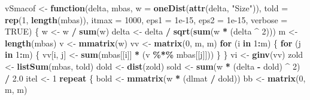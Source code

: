 \documentclass[
  12pt,
]{article}
\newenvironment{Shaded}{\begin{snugshade}}{\end{snugshade}}
\newcommand{\AttributeTok}[1]{\textcolor[rgb]{0.13,0.29,0.53}{#1}}
\newcommand{\ConstantTok}[1]{\textcolor[rgb]{0.56,0.35,0.01}{#1}}
\newcommand{\ControlFlowTok}[1]{\textcolor[rgb]{0.13,0.29,0.53}{\textbf{#1}}}
\newcommand{\DecValTok}[1]{\textcolor[rgb]{0.00,0.00,0.81}{#1}}
\newcommand{\FloatTok}[1]{\textcolor[rgb]{0.00,0.00,0.81}{#1}}
\newcommand{\FunctionTok}[1]{\textcolor[rgb]{0.13,0.29,0.53}{\textbf{#1}}}
\newcommand{\NormalTok}[1]{#1}
\newcommand{\OtherTok}[1]{\textcolor[rgb]{0.56,0.35,0.01}{#1}}
\newcommand{\SpecialCharTok}[1]{\textcolor[rgb]{0.81,0.36,0.00}{\textbf{#1}}}
\newcommand{\StringTok}[1]{\textcolor[rgb]{0.31,0.60,0.02}{#1}}
\begin{document}
\begin{Shaded}
\begin{Highlighting}[]
\NormalTok{vSmacof }\OtherTok{\textless{}{-}}
  \ControlFlowTok{function}\NormalTok{(delta,}
\NormalTok{           mbas,}
           \AttributeTok{w =} \FunctionTok{oneDist}\NormalTok{(}\FunctionTok{attr}\NormalTok{(delta, }\StringTok{"Size"}\NormalTok{)),}
           \AttributeTok{told =} \FunctionTok{rep}\NormalTok{(}\DecValTok{1}\NormalTok{, }\FunctionTok{length}\NormalTok{(mbas)),}
           \AttributeTok{itmax =} \DecValTok{1000}\NormalTok{,}
           \AttributeTok{eps1 =} \FloatTok{1e{-}15}\NormalTok{,}
           \AttributeTok{eps2 =} \FloatTok{1e{-}15}\NormalTok{,}
           \AttributeTok{verbose =} \ConstantTok{TRUE}\NormalTok{) \{}
\NormalTok{    w }\OtherTok{\textless{}{-}}\NormalTok{ w }\SpecialCharTok{/} \FunctionTok{sum}\NormalTok{(w)}
\NormalTok{    delta }\OtherTok{\textless{}{-}}\NormalTok{ delta }\SpecialCharTok{/} \FunctionTok{sqrt}\NormalTok{(}\FunctionTok{sum}\NormalTok{(w }\SpecialCharTok{*}\NormalTok{ (delta }\SpecialCharTok{\^{}} \DecValTok{2}\NormalTok{)))}
\NormalTok{    m }\OtherTok{\textless{}{-}} \FunctionTok{length}\NormalTok{(mbas)}
\NormalTok{    v }\OtherTok{\textless{}{-}} \FunctionTok{mmatrix}\NormalTok{(w)}
\NormalTok{    vv }\OtherTok{\textless{}{-}} \FunctionTok{matrix}\NormalTok{(}\DecValTok{0}\NormalTok{, m, m)}
    \ControlFlowTok{for}\NormalTok{ (i }\ControlFlowTok{in} \DecValTok{1}\SpecialCharTok{:}\NormalTok{m) \{}
      \ControlFlowTok{for}\NormalTok{ (j }\ControlFlowTok{in} \DecValTok{1}\SpecialCharTok{:}\NormalTok{m) \{}
\NormalTok{        vv[i, j] }\OtherTok{\textless{}{-}} \FunctionTok{sum}\NormalTok{(mbas[[i]] }\SpecialCharTok{*}\NormalTok{ (v }\SpecialCharTok{\%*\%}\NormalTok{ mbas[[j]]))}
\NormalTok{      \}}
\NormalTok{    \}}
\NormalTok{    vi }\OtherTok{\textless{}{-}} \FunctionTok{ginv}\NormalTok{(vv)}
\NormalTok{    zold }\OtherTok{\textless{}{-}} \FunctionTok{listSum}\NormalTok{(mbas, told)}
\NormalTok{    dold }\OtherTok{\textless{}{-}} \FunctionTok{dist}\NormalTok{(zold)}
\NormalTok{    sold }\OtherTok{\textless{}{-}} \FunctionTok{sum}\NormalTok{(w }\SpecialCharTok{*}\NormalTok{ (delta }\SpecialCharTok{{-}}\NormalTok{ dold) }\SpecialCharTok{\^{}} \DecValTok{2}\NormalTok{) }\SpecialCharTok{/} \FloatTok{2.0}
\NormalTok{    itel }\OtherTok{\textless{}{-}} \DecValTok{1}
    \ControlFlowTok{repeat}\NormalTok{ \{}
\NormalTok{      bold }\OtherTok{\textless{}{-}} \FunctionTok{mmatrix}\NormalTok{(w }\SpecialCharTok{*}\NormalTok{ (dlmat }\SpecialCharTok{/}\NormalTok{ dold))}
\NormalTok{      bb }\OtherTok{\textless{}{-}} \FunctionTok{matrix}\NormalTok{(}\DecValTok{0}\NormalTok{, m, m)}

\end{Highlighting}
\end{Shaded}
\end{document}
